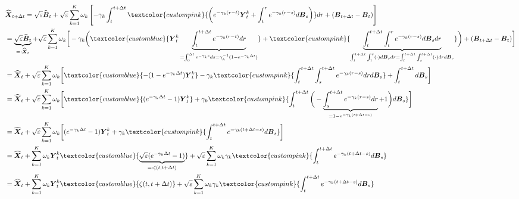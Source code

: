 \documentclass{article}
\newcommand{\bluetext}[1]{\textcolor{customblue}{#1}}
\newcommand{\pinktext}[1]{\textcolor{custompink}{#1}}
\begin{document}
\begin{small}
\begin{align}
    &\widehat{\boldsymbol{X}}_{t+\Delta t}=\sqrt{\varepsilon}\widehat{\boldsymbol{B}}_t+\sqrt{\varepsilon}\sum_{k=1}^K\omega_k \left[-\gamma_k\int_t^{t+\Delta t}\pinktext{\left(e^{-\gamma_k(r-t)}\boldsymbol{Y}_t^k+\int_t^re^{-\gamma_k(r-s)}d\boldsymbol{B}_s\right)}dr +(\boldsymbol{B}_{t+\Delta t}-\boldsymbol{B}_t)\right]\nonumber\\
    &=\underbrace{\sqrt{\varepsilon}\widehat{\boldsymbol{B}}_t}_{=:\widehat{\boldsymbol{X}}_t}+\sqrt{\varepsilon}\sum_{k=1}^K\omega_k \bigg[-\gamma_k\bigg(\bluetext{\boldsymbol{Y}_t^k\underbrace{\int_t^{t+\Delta t}e^{-\gamma_k(r-t)}dr}_{=\int_0^{\Delta t}e^{-\gamma_ks}ds=\gamma_k^{-1}(1-e^{-\gamma_k\Delta t})}}+\pinktext{\underbrace{\int_t^{t+\Delta t}\int_t^re^{-\gamma_k(r-s)}d\boldsymbol{B}_sdr}_{\int_t^{t+\Delta t}\int_t^r(\cdot)d\boldsymbol{B}_sdr=\int _t^{t+\Delta t}\int_s^{t+\Delta t}(\cdot)drd\boldsymbol{B}_s}}\bigg) +(\boldsymbol{B}_{t+\Delta t}-\boldsymbol{B}_t)\bigg]\nonumber\\
    &=\widehat{\boldsymbol{X}}_t+\sqrt{\varepsilon}\sum_{k=1}^K\omega_k \bigg[\bluetext{-(1-e^{-\gamma_k\Delta t})\boldsymbol{Y}_t^k}-\gamma_k\pinktext{\int_t^{t+\Delta t}\int_s^{t+\Delta t}e^{-\gamma_k(r-s)}drd\boldsymbol{B}_s} +\int_t^{t+\Delta t }d\boldsymbol{B}_s\bigg]\nonumber\\
    &=\widehat{\boldsymbol{X}}_t+\sqrt{\varepsilon}\sum_{k=1}^K\omega_k \bigg[\bluetext{(e^{-\gamma_k\Delta t}-1)\boldsymbol{Y}_t^k}+\gamma_k\pinktext{\int_t^{t+\Delta t}\bigg(-\underbrace{\int_s^{t+\Delta t}e^{-\gamma_k(r-s)}dr}_{=1-e^{-\gamma_k(t+\Delta t-s)}} +1\bigg)d\boldsymbol{B}_s} \bigg]\nonumber\\
    &=\widehat{\boldsymbol{X}}_t+\sqrt{\varepsilon}\sum_{k=1}^K\omega_k \bigg[(e^{-\gamma_k\Delta t}-1)\boldsymbol{Y}_t^k+\gamma_k\pinktext{\int_t^{t+\Delta t}e^{-\gamma_k(t+\Delta t-s)}d\boldsymbol{B}_s} \bigg]\nonumber\\
    &=\widehat{\boldsymbol{X}}_t+\sum_{k=1}^K\omega_k\boldsymbol{Y}_t^k \bluetext{\underbrace{\sqrt{\varepsilon}(e^{-\gamma_k\Delta t}-1)}_{=:\zeta(t,t+\Delta t)}}+\sqrt{\varepsilon}\sum_{k=1}^K\omega_k\gamma_k\pinktext{\int_t^{t+\Delta t}e^{-\gamma_k(t+\Delta t-s)}d\boldsymbol{B}_s} \nonumber\\
    &=\widehat{\boldsymbol{X}}_t+\sum_{k=1}^K\omega_k\boldsymbol{Y}_t^k \bluetext{\zeta(t,t+\Delta t)}+\sqrt{\varepsilon}\sum_{k=1}^K\omega_k\gamma_k\pinktext{\int_t^{t+\Delta t}e^{-\gamma_k(t+\Delta t-s)}d\boldsymbol{B}_s} \label{eq:frac-proof-2}
\end{align}
\end{small}
\end{document}
